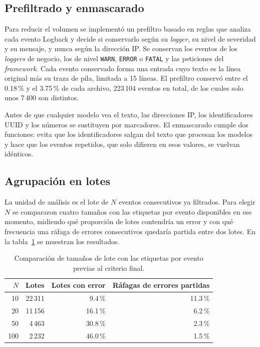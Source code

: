 \subsection{Prefiltrado y enmascarado}\label{subsec:met_prefiltro}

Para reducir el volumen se implementó un prefiltro basado en reglas que analiza cada evento Logback y decide si conservarlo según su \textit{logger}, su nivel de severidad y su mensaje, y nunca según la dirección IP. Se conservan los eventos de los \textit{loggers} de negocio, los de nivel \texttt{WARN}, \texttt{ERROR} o \texttt{FATAL} y las peticiones del \textit{framework}. Cada evento conservado forma una entrada cuyo texto es la línea original más su traza de pila, limitada a 15 líneas. El prefiltro conservó entre el 0.18\,\% y el 3.75\,\% de cada archivo, 223\,104 eventos en total, de los cuales solo unos 7\,400 son distintos.

Antes de que cualquier modelo vea el texto, las direcciones IP, los identificadores UUID y los números se sustituyen por marcadores. El enmascarado cumple dos funciones: evita que los identificadores salgan del texto que procesan los modelos y hace que los eventos repetidos, que solo difieren en esos valores, se vuelvan idénticos.

\subsection{Agrupación en lotes}\label{subsec:met_batches}

La unidad de análisis es el lote de $N$ eventos consecutivos ya filtrados. Para elegir $N$ se compararon cuatro tamaños con las etiquetas por evento disponibles en ese momento, midiendo qué proporción de lotes contendría un error y con qué frecuencia una ráfaga de errores consecutivos quedaría partida entre dos lotes. En la tabla~\ref{tab:met_tamano_lote} se muestran los resultados.

\begin{table}[H]
\centering
\caption{Comparación de tamaños de lote con las etiquetas por evento previas al criterio final.}
\label{tab:met_tamano_lote}
\small
\begin{tabular}{@{}rrrr@{}}
\toprule
$N$ & \textbf{Lotes} & \textbf{Lotes con error} & \textbf{Ráfagas de errores partidas} \\
\midrule
10 & 22\,311 & 9.4\,\% & 11.3\,\% \\
20 & 11\,156 & 16.1\,\% & 6.2\,\% \\
50 & 4\,463 & 30.8\,\% & 2.3\,\% \\
100 & 2\,232 & 46.0\,\% & 1.5\,\% \\
\bottomrule
\end{tabular}
\normalsize
\end{table}

